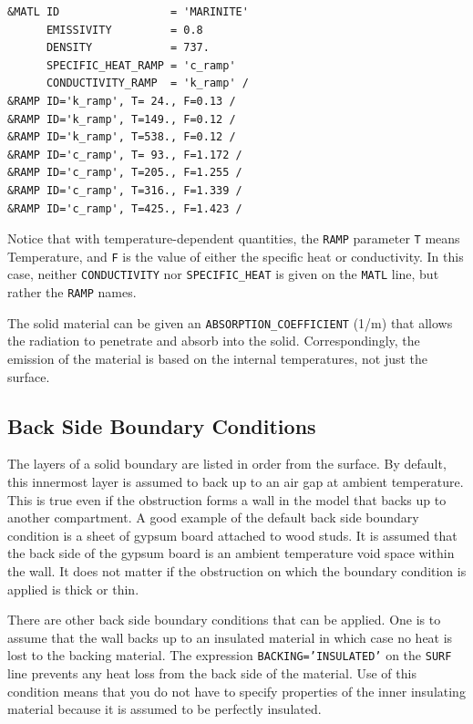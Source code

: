 \documentclass[11pt]{book}
\newcommand{\ct}{\tt\small}
\begin{document}
\footnotesize
\begin{verbatim}
&MATL ID                 = 'MARINITE'
      EMISSIVITY         = 0.8
      DENSITY            = 737.
      SPECIFIC_HEAT_RAMP = 'c_ramp'
      CONDUCTIVITY_RAMP  = 'k_ramp' /
&RAMP ID='k_ramp', T= 24., F=0.13 /
&RAMP ID='k_ramp', T=149., F=0.12 /
&RAMP ID='k_ramp', T=538., F=0.12 /
&RAMP ID='c_ramp', T= 93., F=1.172 /
&RAMP ID='c_ramp', T=205., F=1.255 /
&RAMP ID='c_ramp', T=316., F=1.339 /
&RAMP ID='c_ramp', T=425., F=1.423 /
\end{verbatim}
\normalsize
Notice that with temperature-dependent quantities, the {\ct RAMP} parameter
{\ct T} means Temperature, and {\ct F} is the value of either
the specific heat or conductivity. In this case, neither {\ct CONDUCTIVITY} nor {\ct SPECIFIC\_HEAT} is given on the
{\ct MATL} line, but rather the {\ct RAMP} names.

The solid
material can be given an {\ct ABSORPTION\_COEFFICIENT} (1/m) that allows
the radiation to penetrate and absorb into the solid. Correspondingly,
the emission of the material is based on the internal temperatures,
not just the surface.




\subsection{Back Side Boundary Conditions}
\label{info:BACKING}

The layers of a solid boundary are listed in order from the surface. By default,
this innermost layer is assumed to back up to an air gap at ambient
temperature. This is true even if the obstruction forms a wall in the model that backs up to another
compartment. A good example of the default back side boundary condition is a sheet of gypsum board attached to wood studs.
It is assumed that the back side of the gypsum board is an ambient temperature void space within the wall. It does not
matter if the obstruction on which the boundary condition is applied is thick or thin.

There are other back side boundary conditions that can be applied. One is to assume that the wall
backs up to an insulated material in which case no heat is lost to
the backing material. The expression {\ct BACKING='INSULATED'} on
the {\ct SURF} line prevents any heat loss from the back side of the material. Use of this condition
means that you  do not have to specify properties of the inner insulating material because it is assumed to
be perfectly insulated.
\end{document}
